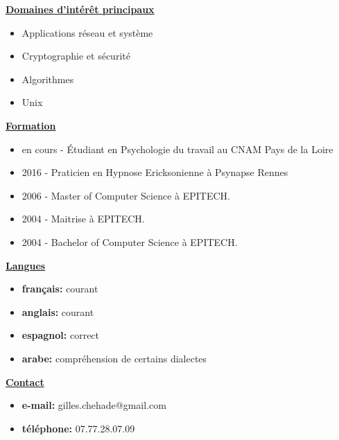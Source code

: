 \documentclass[a4paper,10pt]{letter}
\begin{document}
	\underline{\textbf{Domaines d'int\'er\^et principaux}}\\
		\begin{itemize}
			\item Applications r\'eseau et syst\`eme
			\item Cryptographie et s\'ecurit\'e
			\item Algorithmes
			\item Unix\\
		\end{itemize}

	\underline{\textbf{Formation}}\\
	\begin{itemize}
            \item en cours - \'Etudiant en Psychologie du travail au CNAM Pays de la Loire
            \item 2016 - Praticien en Hypnose Ericksonienne \`a Psynapse Rennes
			\item 2006 - Master of Computer Science \`a {EPITECH.}
			\item 2004 - Maitrise \`a {EPITECH.}
			\item 2004 - Bachelor of Computer Science \`a {EPITECH.}\\
		\end{itemize}

	\underline{\textbf{Langues}}\\
		\begin{itemize}
			\item	\textbf{fran\c cais:}	courant
			\item	\textbf{anglais:}		courant
			\item	\textbf{espagnol:}		correct
			\item	\textbf{arabe:}			compr\'ehension de certains dialectes\\
		\end{itemize}

	\underline{\textbf{Contact}}\\
		\begin{itemize}
			\item	\textbf{e-mail:}	gilles.chehade@gmail.com
			\item	\textbf{t\'el\'ephone:}	07.77.28.07.09
		\end{itemize}

	\pagebreak
\end{document}
